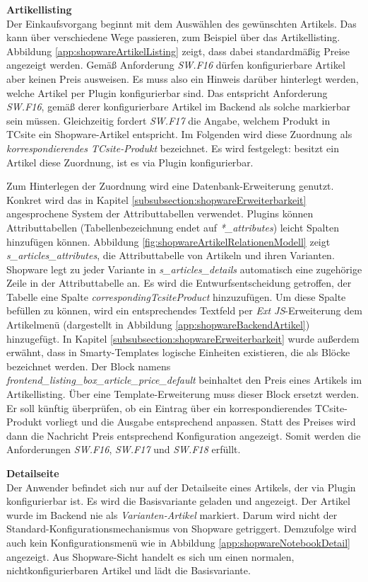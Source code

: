 \documentclass[12pt,a4paper,bibliography=totocnumbered,listof=totoc]{scrartcl}
\begin{document}
\textbf{Artikellisting}\\
Der Einkaufsvorgang beginnt mit dem Auswählen des gewünschten Artikels. Das kann über verschiedene Wege passieren, zum Beispiel über das Artikellisting. Abbildung \ref{app:shopwareArtikelListing} zeigt, dass dabei standardmäßig Preise angezeigt werden. Gemäß Anforderung \emph{SW.F16} dürfen konfigurierbare Artikel aber keinen Preis ausweisen. Es muss also ein Hinweis darüber hinterlegt werden, welche Artikel per Plugin konfigurierbar sind. Das entspricht Anforderung \emph{SW.F16}, gemäß derer konfigurierbare Artikel im Backend als solche markierbar sein müssen. Gleichzeitig fordert \emph{SW.F17} die Angabe, welchem Produkt in TCsite ein Shopware-Artikel entspricht. Im Folgenden wird diese Zuordnung als \emph{korrespondierendes TCsite-Produkt} bezeichnet. Es wird festgelegt: besitzt ein Artikel diese Zuordnung, ist es via Plugin konfigurierbar.

Zum Hinterlegen der Zuordnung wird eine Datenbank-Erweiterung genutzt. Konkret wird das in Kapitel \ref{subsubsection:shopwareErweiterbarkeit} angesprochene System der Attributtabellen verwendet. Plugins können Attributtabellen (Tabellenbezeichnung endet auf \emph{*\_attributes}) leicht Spalten hinzufügen können. Abbildung \ref{fig:shopwareArtikelRelationenModell} zeigt \emph{s\_articles\_attributes}, die Attributtabelle von Artikeln und ihren Varianten. Shopware legt zu jeder Variante in \emph{s\_articles\_details} automatisch eine zugehörige Zeile in der Attributtabelle an. Es wird die Entwurfsentscheidung getroffen, der Tabelle eine Spalte \emph{correspondingTcsiteProduct} hinzuzufügen. Um diese Spalte befüllen zu können, wird ein entsprechendes Textfeld per \emph{Ext JS}-Erweiterung dem Artikelmenü (dargestellt in Abbildung \ref{app:shopwareBackendArtikel}) hinzugefügt. In Kapitel \ref{subsubsection:shopwareErweiterbarkeit} wurde außerdem erwähnt, dass in Smarty-Templates logische Einheiten existieren, die als Blöcke bezeichnet werden. Der Block namens \emph{frontend\_listing\_box\_article\_price\_default} beinhaltet den Preis eines Artikels im Artikellisting.  Über eine Template-Erweiterung muss dieser Block ersetzt werden. Er soll künftig überprüfen, ob ein Eintrag über ein korrespondierendes TCsite-Produkt vorliegt und die Ausgabe entsprechend anpassen. Statt des Preises wird dann die Nachricht  \glqq Preis entsprechend Konfiguration\grqq{} angezeigt. Somit werden die Anforderungen \emph{SW.F16}, \emph{SW.F17} und \emph{SW.F18} erfüllt.

\textbf{Detailseite}\\
Der Anwender befindet sich nur auf der Detailseite eines Artikels, der via Plugin konfigurierbar ist. Es wird die Basisvariante geladen und angezeigt. Der Artikel wurde im Backend nie als \emph{Varianten-Artikel} markiert. Darum wird nicht der Standard-Konfigurationsmechanismus von Shopware getriggert. Demzufolge wird  auch kein Konfigurationsmenü wie in Abbildung \ref{app:shopwareNotebookDetail} angezeigt. Aus Shopware-Sicht handelt es sich um einen normalen, nichtkonfigurierbaren Artikel und lädt die Basisvariante.
\end{document}
